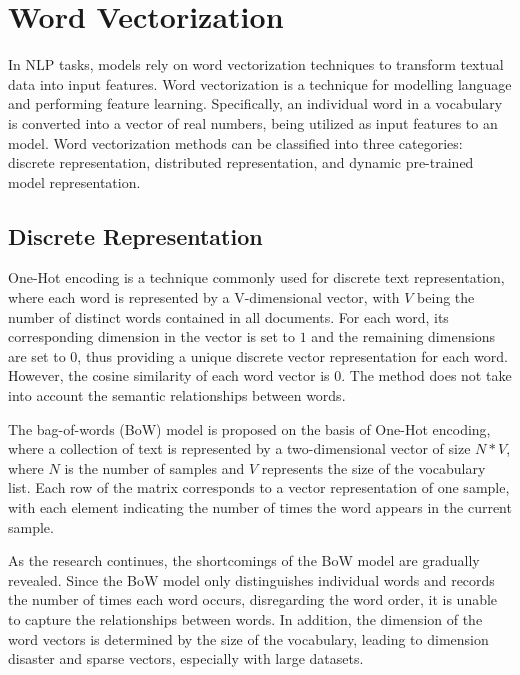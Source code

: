 \documentclass[ %
                    author={Louis Wang},
                supervisor={Dr. Qiang Liu},
                    degree={MSc},
                     title={Identification of Suicide Ideation in Texts},
                      type={},
                      year={2024}]{dissertation}
\begin{document}
\section{Word Vectorization}
\noindent
In NLP tasks, models rely on word vectorization techniques to transform textual data into input features. Word vectorization is a technique for modelling language and performing feature learning. Specifically, an individual word in a vocabulary is converted into a vector of real numbers, being utilized as input features to an model. Word vectorization methods can be classified into three categories: discrete representation, distributed representation, and dynamic pre-trained model representation. %

\subsection{Discrete Representation}
\noindent
One-Hot encoding\cite{chren1998one} is a technique commonly used for discrete text representation, where each word is represented by a V-dimensional vector, with $V$ being the number of distinct words contained in all documents. For each word, its corresponding dimension in the vector is set to $1$ and the remaining dimensions are set to $0$, thus providing a unique discrete vector representation for each word. However, the cosine similarity of each word vector is $0$. The method does not take into account the semantic relationships between words. 

The bag-of-words (BoW) model is proposed on the basis of One-Hot encoding, where a collection of text is represented by a two-dimensional vector of size $N \ast V$, where $N$ is the number of samples and $V$ represents the size of the vocabulary list. Each row of the matrix corresponds to a vector representation of one sample, with each element indicating the number of times the word appears in the current sample. 

As the research continues, the shortcomings of the BoW model are gradually revealed. Since the BoW model only distinguishes individual words and records the number of times each word occurs, disregarding the word order, it is unable to capture the relationships between words\cite{suresh2017multilevel}. In addition, the dimension of the word vectors is determined by the size of the vocabulary, leading to dimension disaster\cite{bengio2013representation} and sparse vectors, especially with large datasets.
\end{document}
